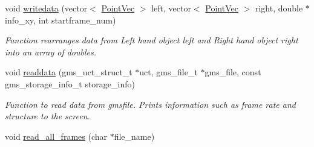 \begin{DoxyCompactItemize}
\item 
void \hyperlink{namespaceGmswriter_a8737f53952c153d6e0b35c974cc99389}{writedata} (vector$<$ \hyperlink{namespaceGmswriter_ae29ac381dbacafec38fd0a06eff6e1ba}{PointVec} $>$ left, vector$<$ \hyperlink{namespaceGmswriter_ae29ac381dbacafec38fd0a06eff6e1ba}{PointVec} $>$ right, double $\ast$info\_\-xy, int startframe\_\-num)
\begin{DoxyCompactList}\small\item\em Function rearranges data from Left hand object {\itshape left\/} and Right hand object {\itshape right\/} into an array of doubles. \end{DoxyCompactList}\item 
void \hyperlink{namespaceGmswriter_af9ffd77859f980d091f948ce7b2b2e21}{readdata} (gms\_\-uct\_\-struct\_\-t $\ast$uct, gms\_\-file\_\-t $\ast$gms\_\-file, const gms\_\-storage\_\-info\_\-t storage\_\-info)
\begin{DoxyCompactList}\small\item\em Function to read data from gmsfile. Prints information such as frame rate and structure to the screen. \end{DoxyCompactList}\item 
\hypertarget{namespaceGmswriter_a564c249213d33942a85ff7f32a62cbc0}{
void \hyperlink{namespaceGmswriter_a564c249213d33942a85ff7f32a62cbc0}{read\_\-all\_\-frames} (char $\ast$file\_\-name)}
\label{namespaceGmswriter_a564c249213d33942a85ff7f32a62cbc0}


\end{DoxyCompactItemize}
